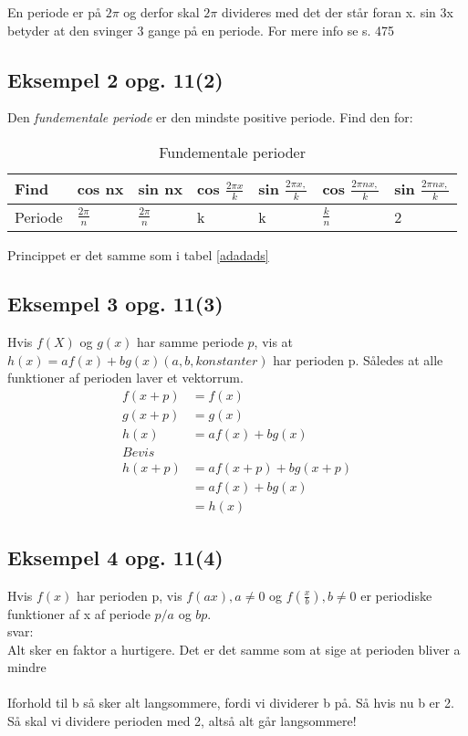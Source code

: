 \documentclass[11pt,fleqn]{book} %
\begin{document}
En periode er på $2\pi$ og derfor skal $2 \pi$ divideres med det der står foran x. sin 3x betyder at den svinger 3 gange på en periode. For mere info se s. 475

\subsection{Eksempel 2 opg. 11(2)}
Den \textit{fundementale periode} er den mindste positive periode. Find den for:\\
\begin{table}[hts!]
\centering
\caption{Fundementale perioder}
\label{my-label}
\begin{tabular}{|l|l|l|l|l|l|l|}
\hline
Find    & cos nx            & sin nx            & cos $\frac{2 \pi x  }{k}$ & sin $\frac{2 \pi x,}{k}$ & cos $\frac{2 \pi nx,}{k}$ & sin $\frac{2 \pi nx,}{k}$ \\ \hline
Periode & $\frac{2 \pi}{n}$ & $\frac{2 \pi}{n}$ & k                        & k                       & $\frac{k}{n}$            & 2                        \\ \hline
\end{tabular}
\end{table}
Princippet er det samme som i tabel \ref{adadads}
\subsection{Eksempel 3 opg. 11(3)}
Hvis $f(X)$ og $g(x)$ har samme periode $p$, vis at  $h(x)=af(x)+bg(x)(a,b,konstanter)$ har perioden p. Således at alle funktioner af perioden laver et vektorrum.\\
\begin{equation}
\begin{split}
f(x+p) &= f(x)\\
g(x+p)&=g(x)\\
h(x) &= af(x)+bg(x)\\
Bevis\\
h(x+p)&=af(x+p)+bg(x+p)\\
&= af(x)+bg(x)\\
&= h(x)
\end{split}
\end{equation}

\subsection{Eksempel 4 opg. 11(4)}
Hvis $f(x)$ har perioden p, vis $f(ax),a\neq 0$ og $f(\frac{x}{b}),b \neq 0$ er periodiske funktioner af x af periode $p/a$ og $bp$.\\
svar:\\
Alt sker en faktor a hurtigere. Det er det samme som at sige at perioden bliver a mindre\\\\
Iforhold til b  så sker alt langsommere, fordi vi dividerer b på. Så hvis nu b er 2. Så skal vi dividere perioden med 2, altså alt går langsommere!
\end{document}
